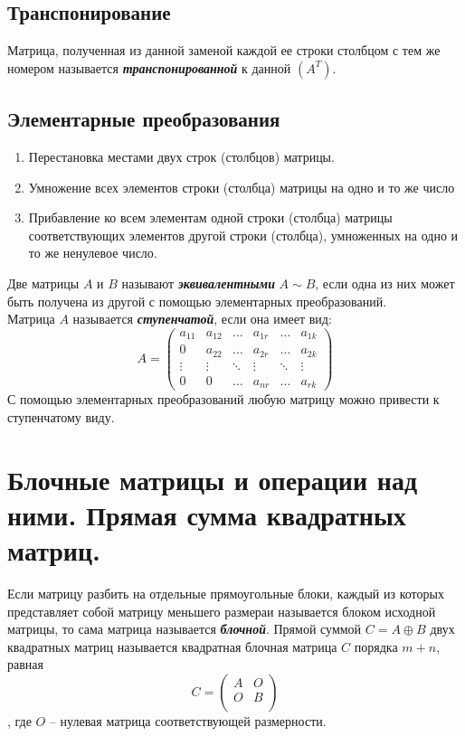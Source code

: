 \documentclass[12pt, fleqn]{article}
\begin{document}
\subsection*{Транспонирование}
Матрица, полученная из данной заменой каждой ее строки столбцом с тем же номером называется \textbf{\textit{транспонированной}} к данной $\left(A^T\right)$.
\subsection*{Элементарные преобразования}
\begin{enumerate}
	\item Перестановка местами двух строк (столбцов) матрицы.
	\item Умножение всех элементов строки (столбца) матрицы на одно и то же число
	\item Прибавление ко всем элементам одной строки (столбца) матрицы соответствующих элементов другой строки (столбца), умноженных на одно и то же ненулевое число.
\end{enumerate}
Две матрицы $A$ и $B$ называют \textbf{\textit{эквивалентными}} $A\sim B$, если одна из них может быть получена из другой с помощью элементарных преобразований.\\
Матрица $A$ называется \textbf{\textit{ступенчатой}}, если она имеет вид:
\begin{equation*}
	A = \left(
		\begin{array}{cccccc}
			a_{11} & a_{12} & \ldots &a_{1r} & \ldots& a_{1k}\\
			0 & a_{22} & \ldots&a_{2r}& \ldots& a_{2k}\\
			\vdots & \vdots & \ddots &\vdots&\ddots& \vdots\\
			0 & 0 & \ldots &a_{nr}&\ldots& a_{rk}
		\end{array}
	\right)
\end{equation*}
С помощью элементарных преобразований любую матрицу можно привести к ступенчатому виду.
\section{Блочные матрицы и операции над ними. Прямая сумма квадратных матриц.}
Если матрицу разбить на отдельные прямоугольные блоки, каждый из которых представляет собой матрицу меньшего размераи называется блоком исходной матрицы, то сама матрица называется \textbf{\textit{блочной}}.
Прямой суммой $C=A\oplus B$ двух квадратных матриц называется квадратная блочная матрица $C$ порядка $m+n$, равная 
\begin{equation*}
	C=\left(\begin{matrix}
		A & O\\
		O & B\\
	\end{matrix}\right)
\end{equation*}, где $O$ -- нулевая матрица соответствующей размерности.
\end{document}
